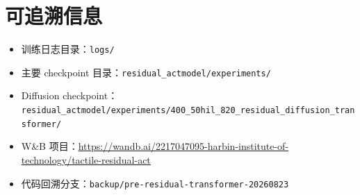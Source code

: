 \documentclass[UTF8,a4paper]{ctexart}
\begin{document}
\section{可追溯信息}
\begin{itemize}
  \item 训练日志目录：\texttt{logs/}
  \item 主要 checkpoint 目录：\texttt{residual\_actmodel/experiments/}
  \item Diffusion checkpoint：\texttt{residual\_actmodel/experiments/400\_50hil\_820\_residual\_diffusion\_transformer/}
  \item W\&B 项目：\url{https://wandb.ai/2217047095-harbin-institute-of-technology/tactile-residual-act}
  \item 代码回溯分支：\texttt{backup/pre-residual-transformer-20260823}
\end{itemize}
\end{document}
